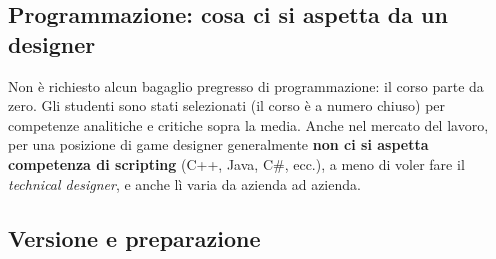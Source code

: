 \subsection{Programmazione: cosa ci si aspetta da un designer}

Non è richiesto alcun bagaglio pregresso di programmazione: il corso parte da
zero. Gli studenti sono stati selezionati (il corso è a numero chiuso) per
competenze analitiche e critiche sopra la media. Anche nel mercato del lavoro,
per una posizione di game designer generalmente \textbf{non ci si aspetta
competenza di scripting} (C++, Java, C\#, ecc.), a meno di voler fare il
\emph{technical designer}, e anche lì varia da azienda ad azienda.

\subsection{Versione e preparazione}

